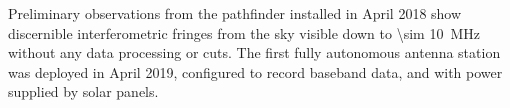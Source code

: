 Preliminary observations from the \attention{\albatros} pathfinder installed in April 2018 show discernible interferometric fringes from the sky visible down to \SI{\sim 10}{\mega \hertz} without any data processing or cuts. The first fully autonomous antenna station was deployed in April 2019, configured to record baseband data, and with power supplied by solar panels. 


